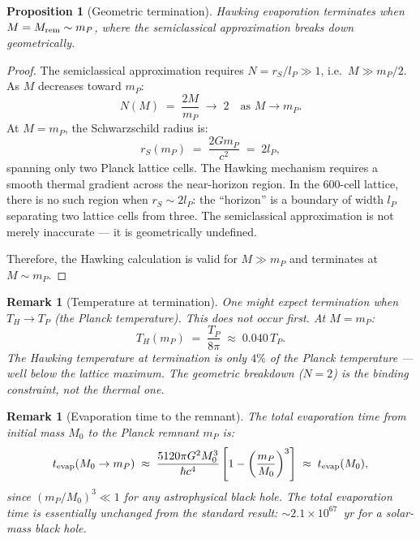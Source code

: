 \documentclass[12pt]{article}
\newtheorem{proposition}[theorem]{Proposition}
\newtheorem{remark}[theorem]{Remark}
\newcommand{\lP}{l_P}
\newcommand{\mP}{m_P}
\newcommand{\TP}{T_P}
\newcommand{\rS}{r_S}
\newcommand{\TH}{T_H}
\begin{document}
\begin{proposition}[Geometric termination]
\label{prop:termination}
Hawking evaporation terminates when $M = M_{\rm rem} \sim \mP$,
where the semiclassical approximation breaks down geometrically.
\end{proposition}

\begin{proof}
The semiclassical approximation requires $N = \rS/\lP \gg 1$,
i.e.\ $M \gg \mP/2$.  As $M$ decreases toward $\mP$:
\begin{equation}
  N(M) \;=\; \frac{2M}{\mP} \;\longrightarrow\; 2
  \quad\text{as } M \to \mP.
  \label{eq:N_mP}
\end{equation}
At $M = \mP$, the Schwarzschild radius is:
\begin{equation}
  \rS(\mP) \;=\; \frac{2G\mP}{c^2} \;=\; 2\lP,
  \label{eq:rS_mP}
\end{equation}
spanning only two Planck lattice cells.  The Hawking mechanism
requires a smooth thermal gradient across the near-horizon region.
In the 600-cell lattice, there is no such region when $\rS \sim 2\lP$:
the ``horizon'' is a boundary of width $\lP$ separating two lattice
cells from three.  The semiclassical approximation is not merely
inaccurate — it is geometrically undefined.

Therefore, the Hawking calculation is valid for $M \gg \mP$ and
terminates at $M \sim \mP$.
\end{proof}

\begin{remark}[Temperature at termination]
One might expect termination when $\TH \to \TP$ (the Planck
temperature).  This does not occur first.  At $M = \mP$:
\begin{equation}
  \TH(\mP) \;=\; \frac{\TP}{8\pi} \;\approx\; 0.040\,\TP.
  \label{eq:TH_mP}
\end{equation}
The Hawking temperature at termination is only $4\%$ of the Planck
temperature — well below the lattice maximum.  The geometric
breakdown ($N = 2$) is the binding constraint, not the thermal one.
\end{remark}

\begin{remark}[Evaporation time to the remnant]
The total evaporation time from initial mass $M_0$ to the Planck
remnant $\mP$ is:
\begin{equation}
  t_{\rm evap}(M_0 \to \mP)
  \;\approx\; \frac{5120\pi G^2 M_0^3}{\hbar c^4}
  \left[1 - \left(\frac{\mP}{M_0}\right)^3\right]
  \;\approx\; t_{\rm evap}(M_0),
  \label{eq:tevap_remnant}
\end{equation}
since $(\mP/M_0)^3 \ll 1$ for any astrophysical black hole.
The total evaporation time is essentially unchanged from the
standard result: $\sim\!2.1\times10^{67}$~yr for a solar-mass
black hole.
\end{remark}
\end{document}
